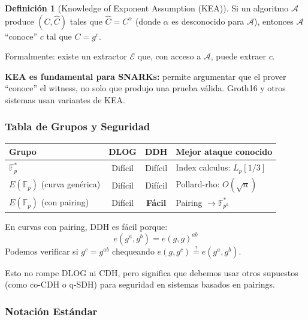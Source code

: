\documentclass[11pt,a4paper,twoside,openright]{book}
\theoremstyle{definition}
\newtheorem{definition}{Definición}[chapter]
\theoremstyle{plain}
\theoremstyle{remark}
\begin{document}
\begin{definition}[Knowledge of Exponent Assumption (KEA)]
Si un algoritmo $\mathcal{A}$ produce $(C, \hat{C})$ tales que $\hat{C} = C^\alpha$ (donde $\alpha$ es desconocido para $\mathcal{A}$), entonces $\mathcal{A}$ ``conoce'' $c$ tal que $C = g^c$.

Formalmente: existe un extractor $\mathcal{E}$ que, con acceso a $\mathcal{A}$, puede extraer $c$.
\end{definition}

\begin{keyidea}
\textbf{KEA es fundamental para SNARKs:} permite argumentar que el prover ``conoce'' el witness, no solo que produjo una prueba válida. Groth16 y otros sistemas usan variantes de KEA.
\end{keyidea}

\subsubsection{Tabla de Grupos y Seguridad}

\begin{center}
\begin{tabular}{lccl}
\toprule
\textbf{Grupo} & \textbf{DLOG} & \textbf{DDH} & \textbf{Mejor ataque conocido} \\
\midrule
$\mathbb{F}_p^*$ & Difícil & Difícil & Index calculus: $L_p[1/3]$ \\
$E(\mathbb{F}_p)$ (curva genérica) & Difícil & Difícil & Pollard-rho: $O(\sqrt{n})$ \\
$E(\mathbb{F}_p)$ (con pairing) & Difícil & \textbf{Fácil} & Pairing $\to \mathbb{F}_{p^k}^*$ \\
\bottomrule
\end{tabular}
\end{center}

\begin{mathnote}
En curvas con pairing, DDH es fácil porque:
\[ e(g^a, g^b) = e(g, g)^{ab} \]
Podemos verificar si $g^c = g^{ab}$ chequeando $e(g, g^c) \stackrel{?}{=} e(g^a, g^b)$.

Esto no rompe DLOG ni CDH, pero significa que debemos usar otros supuestos (como co-CDH o q-SDH) para seguridad en sistemas basados en pairings.
\end{mathnote}

\subsubsection{Notación Estándar}
\end{document}
